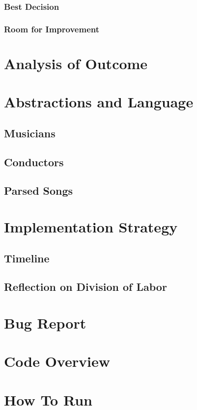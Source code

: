 \documentclass[12pt, letterpaper]{article}
\begin{document}
\subsubsection{Best Decision}
\subsubsection{Room for Improvement}


\section{Analysis of Outcome}


\section{Abstractions and Language}

\subsection{Musicians}
        
\subsection{Conductors}

\subsection{Parsed Songs}


\section{Implementation Strategy}

\subsection{Timeline}

\subsection{Reflection on Division of Labor}


\section{Bug Report}


\section{Code Overview}


\section{How To Run}
\end{document}
